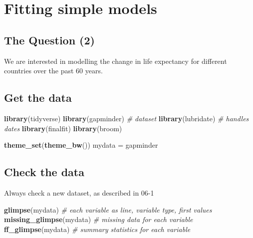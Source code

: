 \documentclass[12pt,]{krantz}
\makeatletter
\newenvironment{Shaded}{\begin{snugshade}}{\end{snugshade}}
\newcommand{\CommentTok}[1]{\textcolor[rgb]{0.56,0.35,0.01}{\textit{#1}}}
\newcommand{\KeywordTok}[1]{\textcolor[rgb]{0.13,0.29,0.53}{\textbf{#1}}}
\newcommand{\NormalTok}[1]{#1}
\newcommand{\StringTok}[1]{\textcolor[rgb]{0.31,0.60,0.02}{#1}}
\newenvironment{kframe}{%
\medskip{}
\setlength{\fboxsep}{.8em}
 \def\at@end@of@kframe{}%
 \ifinner\ifhmode%
  \def\at@end@of@kframe{\end{minipage}}%
  \begin{minipage}{\columnwidth}%
 \fi\fi%
 \def\FrameCommand##1{\hskip\@totalleftmargin \hskip-\fboxsep
 \colorbox{shadecolor}{##1}\hskip-\fboxsep
     \hskip-\linewidth \hskip-\@totalleftmargin \hskip\columnwidth}%
 \MakeFramed {\advance\hsize-\width
   \@totalleftmargin\z@ \linewidth\hsize
   \@setminipage}}%
 {\par\unskip\endMakeFramed%
 \at@end@of@kframe}
\renewenvironment{Shaded}{\begin{kframe}}{\end{kframe}}
\theoremstyle{definition}
\theoremstyle{definition}
\theoremstyle{definition}
\theoremstyle{remark}
\makeatother
\begin{document}
\hypertarget{fitting-simple-models}{%
\section{Fitting simple models}\label{fitting-simple-models}}

\hypertarget{the-question-2}{%
\subsection{The Question (2)}\label{the-question-2}}

We are interested in modelling the change in life expectancy for
different countries over the past 60 years.

\hypertarget{get-the-data-1}{%
\subsection{Get the data}\label{get-the-data-1}}

\begin{Shaded}
\begin{Highlighting}[]
\KeywordTok{library}\NormalTok{(tidyverse)}
\KeywordTok{library}\NormalTok{(gapminder) }\CommentTok{# dataset}
\KeywordTok{library}\NormalTok{(lubridate) }\CommentTok{# handles dates}
\KeywordTok{library}\NormalTok{(finalfit)}
\KeywordTok{library}\NormalTok{(broom)}

\KeywordTok{theme_set}\NormalTok{(}\KeywordTok{theme_bw}\NormalTok{())}
\NormalTok{mydata =}\StringTok{ }\NormalTok{gapminder}
\end{Highlighting}
\end{Shaded}

\hypertarget{check-the-data-1}{%
\subsection{Check the data}\label{check-the-data-1}}

Always check a new dataset, as described in 06-1

\begin{Shaded}
\begin{Highlighting}[]
\KeywordTok{glimpse}\NormalTok{(mydata) }\CommentTok{# each variable as line, variable type, first values}
\KeywordTok{missing_glimpse}\NormalTok{(mydata) }\CommentTok{# missing data for each variable}
\KeywordTok{ff_glimpse}\NormalTok{(mydata) }\CommentTok{# summary statistics for each variable}
\end{Highlighting}
\end{Shaded}
\end{document}
